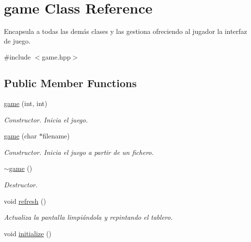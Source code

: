 \hypertarget{classgame}{\section{game Class Reference}
\label{classgame}
}


Encapsula a todas las demás clases y las gestiona ofreciendo al jugador la interfaz de juego.  




{\ttfamily \#include $<$game.\-hpp$>$}

\subsection*{Public Member Functions}
\begin{DoxyCompactItemize}
\item 
\hyperlink{classgame_a7d6df2ef95a2e8c91063c45bdece227c}{game} (int, int)
\begin{DoxyCompactList}\small\item\em Constructor. Inicia el juego. \end{DoxyCompactList}\item 
\hyperlink{classgame_a192ee2fc31be4c76067c2c73cbb8da7d}{game} (char $\ast$filename)
\begin{DoxyCompactList}\small\item\em Constructor. Inicia el juego a partir de un fichero. \end{DoxyCompactList}\item 
\hypertarget{classgame_ae87abd20c4d8a7906fa48e690a5f1d07}{\hyperlink{classgame_ae87abd20c4d8a7906fa48e690a5f1d07}{$\sim$game} ()}\label{classgame_ae87abd20c4d8a7906fa48e690a5f1d07}

\begin{DoxyCompactList}\small\item\em Destructor. \end{DoxyCompactList}\item 
\hypertarget{classgame_aa266348a9043a5f44d50126849215977}{void \hyperlink{classgame_aa266348a9043a5f44d50126849215977}{refresh} ()}\label{classgame_aa266348a9043a5f44d50126849215977}

\begin{DoxyCompactList}\small\item\em Actualiza la pantalla limpiándola y repintando el tablero. \end{DoxyCompactList}\item 
\hypertarget{classgame_a3140391458e0e2cefcacaca8bd50eb20}{void \hyperlink{classgame_a3140391458e0e2cefcacaca8bd50eb20}{initialize} ()}\label{classgame_a3140391458e0e2cefcacaca8bd50eb20}


\end{DoxyCompactItemize}
